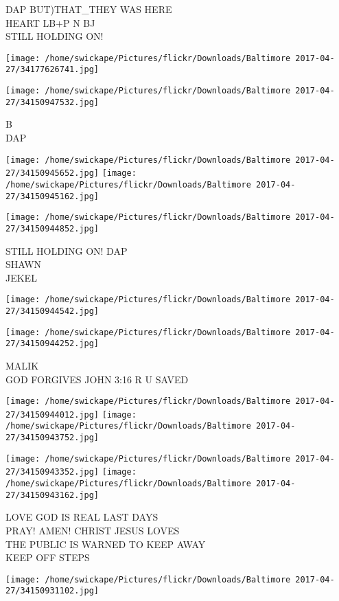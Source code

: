 \documentclass[10pt,letterpaper]{article}
\begin{document}
DAP BUT)THAT\_THEY WAS HERE\\
HEART LB+P N BJ\\
STILL HOLDING ON!
\pagebreak

\texttt{[image: /home/swickape/Pictures/flickr/Downloads/Baltimore 2017-04-27/34177626741.jpg]}

\vspace{0.25in}
\texttt{[image: /home/swickape/Pictures/flickr/Downloads/Baltimore 2017-04-27/34150947532.jpg]}

B\\
DAP
\pagebreak

\texttt{[image: /home/swickape/Pictures/flickr/Downloads/Baltimore 2017-04-27/34150945652.jpg]}
\texttt{[image: /home/swickape/Pictures/flickr/Downloads/Baltimore 2017-04-27/34150945162.jpg]}

\texttt{[image: /home/swickape/Pictures/flickr/Downloads/Baltimore 2017-04-27/34150944852.jpg]}

STILL HOLDING ON!  DAP\\
SHAWN\\
JEKEL
\pagebreak

\texttt{[image: /home/swickape/Pictures/flickr/Downloads/Baltimore 2017-04-27/34150944542.jpg]}

\vspace{0.25in}
\texttt{[image: /home/swickape/Pictures/flickr/Downloads/Baltimore 2017-04-27/34150944252.jpg]}

MALIK\\
GOD FORGIVES JOHN 3:16 R U SAVED
\pagebreak

\texttt{[image: /home/swickape/Pictures/flickr/Downloads/Baltimore 2017-04-27/34150944012.jpg]}
\texttt{[image: /home/swickape/Pictures/flickr/Downloads/Baltimore 2017-04-27/34150943752.jpg]}

\texttt{[image: /home/swickape/Pictures/flickr/Downloads/Baltimore 2017-04-27/34150943352.jpg]}
\texttt{[image: /home/swickape/Pictures/flickr/Downloads/Baltimore 2017-04-27/34150943162.jpg]}

LOVE GOD IS REAL LAST DAYS\\
PRAY!  AMEN!  CHRIST JESUS LOVES\\
THE PUBLIC IS WARNED TO KEEP AWAY\\
KEEP OFF STEPS
\pagebreak

\texttt{[image: /home/swickape/Pictures/flickr/Downloads/Baltimore 2017-04-27/34150931102.jpg]}
\end{document}
